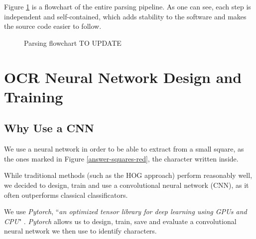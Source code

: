 \documentclass[11pt, a4paper]{report}
\begin{document}
Figure \ref{parsing-flow} is a flowchart of the entire parsing pipeline. As one can see, each step is independent and self-contained, which adds stability to the software and makes the source code easier to follow. 

\begin{figure}[!h]
	\centering
	\caption{Parsing flowchart TO UPDATE}
	\label{parsing-flow}
\end{figure}



\chapter{OCR Neural Network Design and Training}
\label{chapter-ocr-neural-network}

\section{Why Use a CNN}

We use a neural network in order to be able to extract from a small square, as the ones marked in Figure \ref{answer-squares-red}, the character written inside.

While traditional methods (such as the HOG\cite{HOG} approach) perform reasonably well, we decided to design, train and use a convolutional neural network (CNN)\cite{CNN}, as it often outperforms classical classificators.

We use \textit{Pytorch}, ``\textit{an optimized tensor library for deep learning using GPUs and CPU}" \cite{pytorch}. \textit{Pytorch} allows us to design, train, save and evaluate a convolutional neural network we then use to identify characters.
\end{document}
